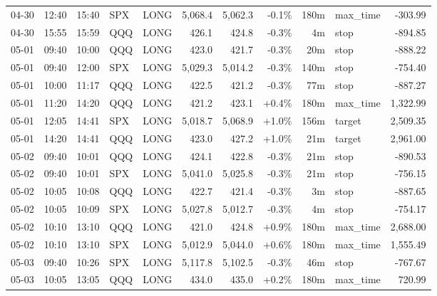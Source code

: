 \documentclass[11pt,a4paper,twoside]{article}
\begin{document}
\begin{center}
\begin{longtable}{>{\color{txtmain}}l l l l l r r r r >{\color{txtmain}}l r}
04-30 & 12:40 & 15:40 & SPX & LONG & 5,068.4 & 5,062.3 & \textcolor{lossred}{-0.1\%} & 180m & max\_time & \textcolor{lossred}{-303.99} \\
04-30 & 15:55 & 15:59 & QQQ & LONG & 426.1 & 424.8 & \textcolor{lossred}{-0.3\%} & 4m & stop & \textcolor{lossred}{-894.85} \\
05-01 & 09:40 & 10:00 & QQQ & LONG & 423.0 & 421.7 & \textcolor{lossred}{-0.3\%} & 20m & stop & \textcolor{lossred}{-888.22} \\
05-01 & 09:40 & 12:00 & SPX & LONG & 5,029.3 & 5,014.2 & \textcolor{lossred}{-0.3\%} & 140m & stop & \textcolor{lossred}{-754.40} \\
05-01 & 10:00 & 11:17 & QQQ & LONG & 422.5 & 421.2 & \textcolor{lossred}{-0.3\%} & 77m & stop & \textcolor{lossred}{-887.27} \\
05-01 & 11:20 & 14:20 & QQQ & LONG & 421.2 & 423.1 & \textcolor{wingreen}{+0.4\%} & 180m & max\_time & \textcolor{wingreen}{1,322.99} \\
05-01 & 12:05 & 14:41 & SPX & LONG & 5,018.7 & 5,068.9 & \textcolor{wingreen}{+1.0\%} & 156m & target & \textcolor{wingreen}{2,509.35} \\
05-01 & 14:20 & 14:41 & QQQ & LONG & 423.0 & 427.2 & \textcolor{wingreen}{+1.0\%} & 21m & target & \textcolor{wingreen}{2,961.00} \\
05-02 & 09:40 & 10:01 & QQQ & LONG & 424.1 & 422.8 & \textcolor{lossred}{-0.3\%} & 21m & stop & \textcolor{lossred}{-890.53} \\
05-02 & 09:40 & 10:01 & SPX & LONG & 5,041.0 & 5,025.8 & \textcolor{lossred}{-0.3\%} & 21m & stop & \textcolor{lossred}{-756.15} \\
05-02 & 10:05 & 10:08 & QQQ & LONG & 422.7 & 421.4 & \textcolor{lossred}{-0.3\%} & 3m & stop & \textcolor{lossred}{-887.65} \\
05-02 & 10:05 & 10:09 & SPX & LONG & 5,027.8 & 5,012.7 & \textcolor{lossred}{-0.3\%} & 4m & stop & \textcolor{lossred}{-754.17} \\
05-02 & 10:10 & 13:10 & QQQ & LONG & 421.0 & 424.8 & \textcolor{wingreen}{+0.9\%} & 180m & max\_time & \textcolor{wingreen}{2,688.00} \\
05-02 & 10:10 & 13:10 & SPX & LONG & 5,012.9 & 5,044.0 & \textcolor{wingreen}{+0.6\%} & 180m & max\_time & \textcolor{wingreen}{1,555.49} \\
05-03 & 09:40 & 10:26 & SPX & LONG & 5,117.8 & 5,102.5 & \textcolor{lossred}{-0.3\%} & 46m & stop & \textcolor{lossred}{-767.67} \\
05-03 & 10:05 & 13:05 & QQQ & LONG & 434.0 & 435.0 & \textcolor{wingreen}{+0.2\%} & 180m & max\_time & \textcolor{wingreen}{720.99} \\

\end{longtable}
\end{center}
\end{document}
